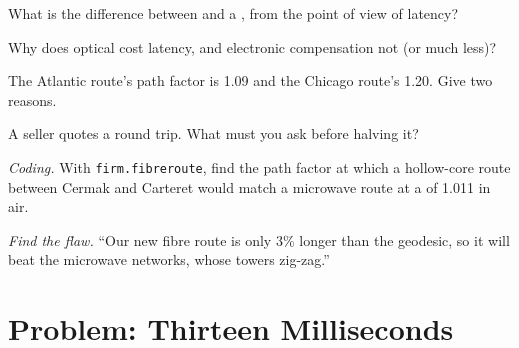 \begin{exercise}[$\star$]\label{exo:nw:long-haul-fibre:3}
What is the difference between  and a , from the point of view of latency?
\end{exercise}

\begin{exercise}[$\star\star$]\label{exo:nw:long-haul-fibre:4}
Why does optical  cost latency, and electronic compensation not (or much less)?
\end{exercise}

\begin{exercise}[$\star\star$]\label{exo:nw:long-haul-fibre:5}
The Atlantic route's path factor is 1.09 and the Chicago route's 1.20. Give two reasons.
\end{exercise}

\begin{exercise}[$\star\star$]\label{exo:nw:long-haul-fibre:6}
A seller quotes a round trip. What must you ask before halving it?
\end{exercise}

\begin{exercise}[$\star\star\star$]\label{exo:nw:long-haul-fibre:7}
\emph{Coding.} With \texttt{firm.fibreroute}, find the path factor at which a hollow-core route between Cermak and Carteret would match a
microwave route at a  of 1.011 in air.
\end{exercise}

\begin{exercise}[$\star\star\star$]\label{exo:nw:long-haul-fibre:8}
\emph{Find the flaw.} ``Our new fibre route is only 3\% longer than the geodesic, so it will beat the microwave networks, whose towers zig-zag.''
\end{exercise}

\section{Problem: Thirteen Milliseconds}

